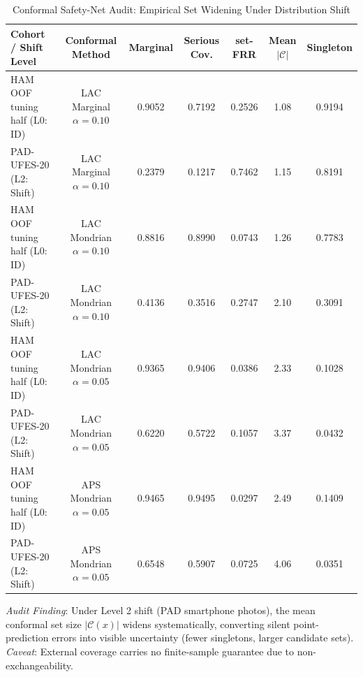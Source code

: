 \begin{table}[t]
\caption{Conformal Safety-Net Audit: Empirical Set Widening Under Distribution Shift}
\label{tab:conformal_shift}
\centering
\footnotesize
\begin{tabular}{lcccccc}
\toprule
\textbf{Cohort / Shift Level} & \textbf{Conformal Method} & \textbf{Marginal} & \textbf{Serious Cov.} & \textbf{set-FRR} & \textbf{Mean $|\mathcal{C}|$} & \textbf{Singleton} \\
\midrule
HAM OOF tuning half (L0: ID) & LAC Marginal $\alpha=0.10$ & 0.9052 & 0.7192 & 0.2526 & 1.08 & 0.9194 \\
PAD-UFES-20 (L2: Shift) & LAC Marginal $\alpha=0.10$ & 0.2379 & 0.1217 & 0.7462 & 1.15 & 0.8191 \\
HAM OOF tuning half (L0: ID) & LAC Mondrian $\alpha=0.10$ & 0.8816 & 0.8990 & 0.0743 & 1.26 & 0.7783 \\
PAD-UFES-20 (L2: Shift) & LAC Mondrian $\alpha=0.10$ & 0.4136 & 0.3516 & 0.2747 & 2.10 & 0.3091 \\
HAM OOF tuning half (L0: ID) & LAC Mondrian $\alpha=0.05$ & 0.9365 & 0.9406 & 0.0386 & 2.33 & 0.1028 \\
PAD-UFES-20 (L2: Shift) & LAC Mondrian $\alpha=0.05$ & 0.6220 & 0.5722 & 0.1057 & 3.37 & 0.0432 \\
HAM OOF tuning half (L0: ID) & APS Mondrian $\alpha=0.05$ & 0.9465 & 0.9495 & 0.0297 & 2.49 & 0.1409 \\
PAD-UFES-20 (L2: Shift) & APS Mondrian $\alpha=0.05$ & 0.6548 & 0.5907 & 0.0725 & 4.06 & 0.0351 \\
\bottomrule
\end{tabular}
\vspace{1mm}
\parbox{\linewidth}{\raggedright \emph{Audit Finding}: Under Level 2 shift (PAD smartphone photos), the mean conformal set size $|\mathcal{C}(x)|$ widens systematically, converting silent point-prediction errors into visible uncertainty (fewer singletons, larger candidate sets). \emph{Caveat}: External coverage carries no finite-sample guarantee due to non-exchangeability.}
\end{table}